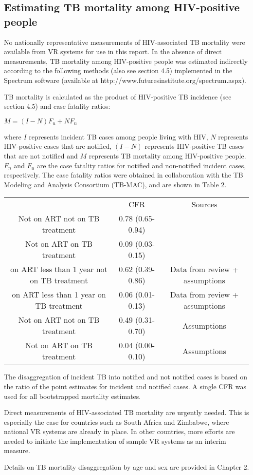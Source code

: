 \subsection{Estimating TB mortality among HIV-positive people}

No nationally representative measurements of HIV-associated TB mortality were available from VR systems for use in this report. In the absence of direct measurements, TB mortality among HIV-positive people was estimated indirectly according to the following methods (also see section 4.5) implemented in the Spectrum software (available at http://www.futuresinstitute.org/spectrum.aspx).

TB mortality is calculated as the product of HIV-positive TB incidence (see section 4.5) and case fatality ratios:

$M = (I-N)F_u + NF_n$ 									

where $I$ represents incident TB cases among people living with HIV, $N$ represents HIV-positive cases that are notified, $(I-N)$ represents HIV-positive TB cases that are not notified and $M$ represents TB mortality among HIV-positive people. $F_n$ and $F_u$ are the case fatality ratios for notified and non-notified incident cases, respectively. The case fatality ratios were obtained in collaboration with the TB Modeling and Analysis Consortium (TB-MAC), and are shown in Table 2.

\begin{table} 
    \begin{tabular}{ c c c }
         & CFR & Sources \\ 
        Not on ART not on TB treatment & 0.78 (0.65-0.94) &  \cite{12742798} \\ 
        Not on ART on TB treatment & 0.09 (0.03-0.15) & \cite{21738585} \cite{11216921}\\ 
        on ART less than 1 year not on TB treatment & 0.62 (0.39-0.86) & Data from review + assumptions \\ 
        on ART less than 1 year on TB treatment &  0.06 (0.01-0.13) & Data from review + assumptions \\ 
        Not on ART not on TB treatment & 0.49 (0.31-0.70) & Assumptions \\ 
        Not on ART on TB treatment & 0.04 (0.00-0.10) & Assumptions \\ 
    \end{tabular} 
\end{table}

The disaggregation of incident TB into notified and not notified cases is based on the ratio of the point estimates for incident and notified cases. A single CFR was used for all bootstrapped mortality estimates.

Direct measurements of HIV-associated TB mortality are urgently needed. This is especially the case for countries such as South Africa and Zimbabwe, where national VR systems are already in place. In other countries, more efforts are needed to initiate the implementation of sample VR systems as an interim measure.

Details on TB mortality disaggregation by age and sex are provided in Chapter 2.
